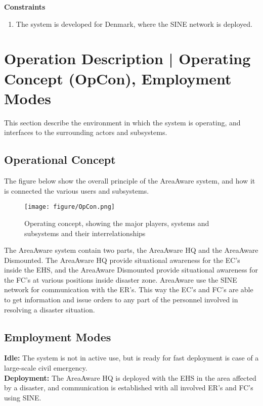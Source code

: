 \noindent \textbf{Constraints}
\begin{enumerate}
	\item The system is developed for Denmark, where the SINE network is deployed.
\end{enumerate}

\section{Operation Description | Operating Concept (OpCon), Employment Modes}

This section describe the environment in which the system is operating, and interfaces to the surrounding actors and subsystems.

\subsection{Operational Concept}
The figure below show the overall principle of the AreaAware system, and how it is connected the various users and subsystems.

\begin{figure}[ht]
	\centering
	\texttt{[image: figure/OpCon.png]}
	\caption{Operating concept, showing the major players, systems and subsystems and their interrelationships}
	\label{fig:OpCon}
\end{figure}

\FloatBarrier

\noindent The AreaAware system contain two parts, the AreaAware HQ and the AreaAware Dismounted. The AreaAware HQ provide situational awareness for the EC's inside the EHS, and the AreaAware Dismounted provide situational awareness for the FC's at various positions inside disaster zone. AreaAware use the SINE network for communication with the ER's. This way the EC's and FC's are able to get information and issue orders to any part of the personnel involved in resolving a disaster situation.

\subsection{Employment Modes}
\textbf{Idle:} The system is not in active use, but is ready for fast deployment is case of a large-scale civil emergency.\\

\noindent \textbf{Deployment:} The AreaAware HQ is deployed with the EHS in the area affected by a disaster, and communication is established with all involved ER's and FC's using SINE.\\
 
